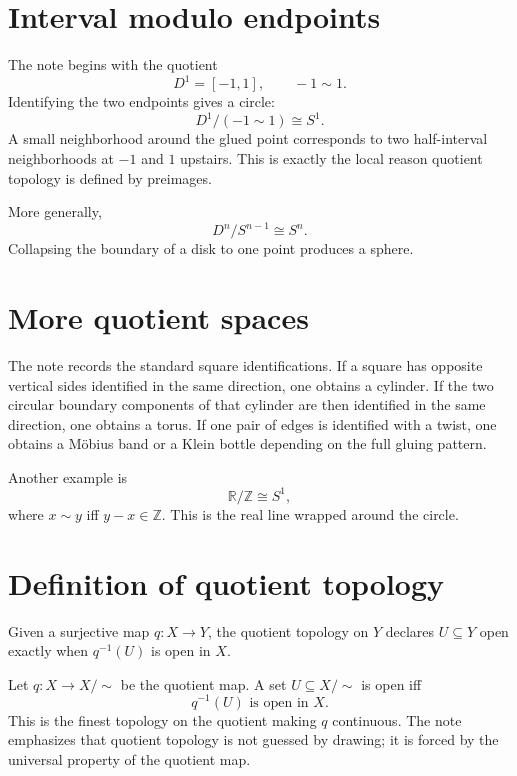 
\section{Interval modulo endpoints}

The note begins with the quotient
\[
  D^1=[-1,1],\qquad -1\sim1.
\]
Identifying the two endpoints gives a circle:
\[
  D^1/(-1\sim1)\cong S^1.
\]
A small neighborhood around the glued point corresponds to two half-interval neighborhoods at \(-1\) and \(1\) upstairs.  This is exactly the local reason quotient topology is defined by preimages.

More generally,
\[
  D^n/S^{n-1}\cong S^n.
\]
Collapsing the boundary of a disk to one point produces a sphere.

\section{More quotient spaces}

The note records the standard square identifications.  If a square has opposite vertical sides identified in the same direction, one obtains a cylinder.  If the two circular boundary components of that cylinder are then identified in the same direction, one obtains a torus.  If one pair of edges is identified with a twist, one obtains a Möbius band or a Klein bottle depending on the full gluing pattern.

Another example is
\[
  \mathbb R/\mathbb Z\cong S^1,
\]
where \(x\sim y\) iff \(y-x\in\mathbb Z\).  This is the real line wrapped around the circle.

\section{Definition of quotient topology}

\begin{definition}
Given a surjective map \(q:X\to Y\), the quotient topology on \(Y\) declares \(U\subseteq Y\) open exactly when \(q^{-1}(U)\) is open in \(X\).
\end{definition}


Let \(q:X\to X/{\sim}\) be the quotient map.  A set \(U\subseteq X/{\sim}\) is open iff
\[
  q^{-1}(U)\text{ is open in }X.
\]
This is the finest topology on the quotient making \(q\) continuous.  The note emphasizes that quotient topology is not guessed by drawing; it is forced by the universal property of the quotient map.

